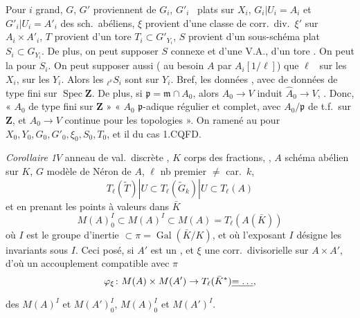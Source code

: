 \documentclass[11pt,a4paper]{article}
\begin{document}
Pour $i$ grand, $G$, $G'$ proviennent de $G_i$, $G'_i$ \ plats sur $X_i$, 
$G_i|U_i = A_i$ et $G'_i|U_i = A'_i$ des sch.\ abéliens, $\xi$ provient d'une
classe de corr.\ div.\ $\xi'$ sur $A_i \times A'_i$, $T$ provient d'un tore
$T_i \subset G'_{Y_i}$, $S$ provient d'un sous-schéma plat $S_i \subset
G_{Y_i}$. De plus, \struck{\ill{}} \ill{} on peut  supposer $S$ connexe  et \struck{\ill{} \ill{} \ill{}}
\struck{\ill{} \ill{} \ill{}}  \struck{\ill{}}
 d'une V.A., d'un tore \struck{\ill{} \ill{} \ill{}}
  \ill{}. On peut  la
 \ill{} \ill{} pour $S_i$. \struck{\ill{}} On peut supposer
aussi ( au besoin  $A$ par $A_i[1/\ell]$)
que $\ell$ \ sur les $X_i$, \ill{} \ill{} sur les $Y_i$. Alors
les ${}_{\ell^\nu}S_i$ sont  \ill{} \ill{} 
sur $Y_i$. Bref,  les données , avec
 \ill{}  de \ill{} données \ill{} \ill{}
 de type fini sur $\operatorname{Spec}
\mathbf{Z}$. De plus, si $\mathfrak{p} = \mathfrak{m} \cap A_0$, alors $A_0
\to V$ induit $\hat A_0 \to V$, \struck{\ill{}}. Donc, \ill{} \ill{}
 \ill{} \ill{} « $A_0$ de type fini sur $\mathbf{Z}$ »
 « $A_0$ $\mathfrak{p}$-adique régulier et complet, avec
$A_0/\mathfrak{p}$ de t.f.\ sur $\mathbf{Z}$, et $A_0 \to V$ continue pour les
topologies  ». On  ramené 
au  pour \ill{} $X_0, Y_0, G_0, G'_0, \xi_0, S_0, T_0$, et
il  du cas 1.\quad CQFD.

\emph{Corollaire 1}\quad $V$ anneau de val.\ discrète , $K$ corps des fractions, , $A$
schéma abélien sur $K$, $G$ modèle de Néron de $A$,   $\ell$ nb premier $\neq$ car.\ $k$,
\[
T_\ell(\tilde T)|U \subset T_\ell(\tilde G_k)|U \subset T_\ell(A)
\]
et en prenant les points à valeurs dans $\bar K$
\[
M(A)^I_0 \subset M(A)^I \subset M(A) = T_\ell(A(\bar K))
\]
où $I$ est le groupe d'inertie $\subset \pi = \operatorname{Gal}(\bar K/K)$,
et où l'exposant $I$ désigne les invariants sous $I$.
Ceci posé, si $A'$ est un  ,
et $\xi$ une \struck{\ill{}} corr.\ divisorielle sur $A \times A'$, d'où un
accouplement compatible avec $\pi$
\[
\varphi_\xi \colon M(A) \times M(A') \to T_\ell(\bar K^*) \struck{= \ldots} ,
\]
 des \emph{}  $M(A)^I$ et
$M(A')^I_0$, \ill{}  $M(A)^I_0$ et $M(A')^I$.
\end{document}
